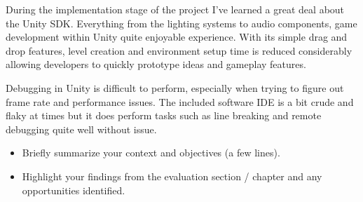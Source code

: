 During the implementation stage of the project I've learned a great deal about the Unity SDK. Everything from the lighting systems to audio components, game development within Unity quite enjoyable experience. With its simple drag and drop features, level creation and environment setup time is reduced considerably allowing developers to quickly prototype ideas and gameplay features.

Debugging in Unity is difficult to perform, especially when trying to figure out frame rate and performance issues. The included software IDE is a bit crude and flaky at times but it does perform tasks such as line breaking and remote debugging quite well without issue. 

\begin{itemize}
\item Briefly summarize your context and objectives (a few lines).
\item Highlight your findings from the evaluation section / chapter and any opportunities identified.
\end{itemize}

